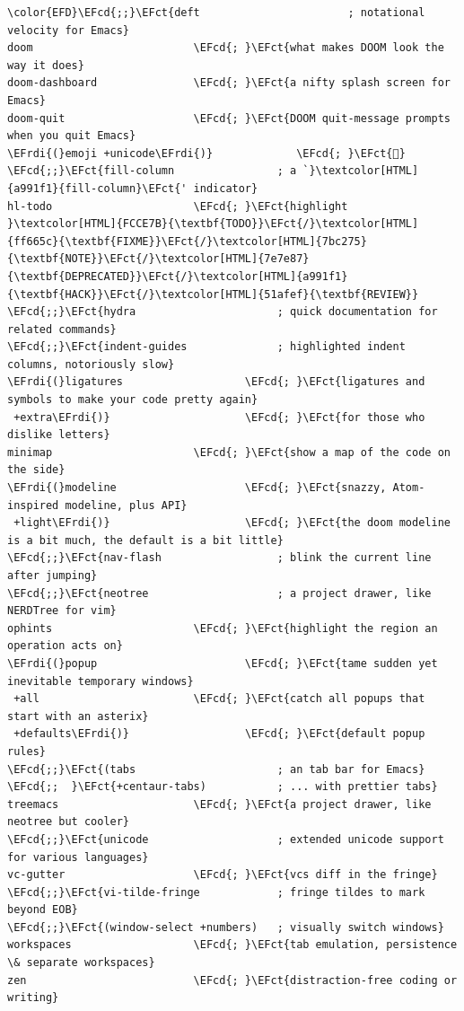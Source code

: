 \documentclass{scrartcl}
\newcommand{\EFct}[1]{\textcolor{EFct}{#1}} %
\newcommand{\EFcd}[1]{\textcolor{EFcd}{#1}} %
\newcommand{\EFrdi}[1]{#1} %
\begin{document}
\begin{enumerate}
\begin{Code}
\begin{Verbatim}[]
\color{EFD}\EFcd{;;}\EFct{deft                       ; notational velocity for Emacs}
doom                         \EFcd{; }\EFct{what makes DOOM look the way it does}
doom-dashboard               \EFcd{; }\EFct{a nifty splash screen for Emacs}
doom-quit                    \EFcd{; }\EFct{DOOM quit-message prompts when you quit Emacs}
\EFrdi{(}emoji +unicode\EFrdi{)}             \EFcd{; }\EFct{🙂}
\EFcd{;;}\EFct{fill-column                ; a `}\textcolor[HTML]{a991f1}{fill-column}\EFct{' indicator}
hl-todo                      \EFcd{; }\EFct{highlight }\textcolor[HTML]{FCCE7B}{\textbf{TODO}}\EFct{/}\textcolor[HTML]{ff665c}{\textbf{FIXME}}\EFct{/}\textcolor[HTML]{7bc275}{\textbf{NOTE}}\EFct{/}\textcolor[HTML]{7e7e87}{\textbf{DEPRECATED}}\EFct{/}\textcolor[HTML]{a991f1}{\textbf{HACK}}\EFct{/}\textcolor[HTML]{51afef}{\textbf{REVIEW}}
\EFcd{;;}\EFct{hydra                      ; quick documentation for related commands}
\EFcd{;;}\EFct{indent-guides              ; highlighted indent columns, notoriously slow}
\EFrdi{(}ligatures                   \EFcd{; }\EFct{ligatures and symbols to make your code pretty again}
 +extra\EFrdi{)}                     \EFcd{; }\EFct{for those who dislike letters}
minimap                      \EFcd{; }\EFct{show a map of the code on the side}
\EFrdi{(}modeline                    \EFcd{; }\EFct{snazzy, Atom-inspired modeline, plus API}
 +light\EFrdi{)}                     \EFcd{; }\EFct{the doom modeline is a bit much, the default is a bit little}
\EFcd{;;}\EFct{nav-flash                  ; blink the current line after jumping}
\EFcd{;;}\EFct{neotree                    ; a project drawer, like NERDTree for vim}
ophints                      \EFcd{; }\EFct{highlight the region an operation acts on}
\EFrdi{(}popup                       \EFcd{; }\EFct{tame sudden yet inevitable temporary windows}
 +all                        \EFcd{; }\EFct{catch all popups that start with an asterix}
 +defaults\EFrdi{)}                  \EFcd{; }\EFct{default popup rules}
\EFcd{;;}\EFct{(tabs                      ; an tab bar for Emacs}
\EFcd{;;  }\EFct{+centaur-tabs)           ; ... with prettier tabs}
treemacs                     \EFcd{; }\EFct{a project drawer, like neotree but cooler}
\EFcd{;;}\EFct{unicode                    ; extended unicode support for various languages}
vc-gutter                    \EFcd{; }\EFct{vcs diff in the fringe}
\EFcd{;;}\EFct{vi-tilde-fringe            ; fringe tildes to mark beyond EOB}
\EFcd{;;}\EFct{(window-select +numbers)   ; visually switch windows}
workspaces                   \EFcd{; }\EFct{tab emulation, persistence \& separate workspaces}
zen                          \EFcd{; }\EFct{distraction-free coding or writing}
\end{Verbatim}
\end{Code}


\end{enumerate}
\end{document}
